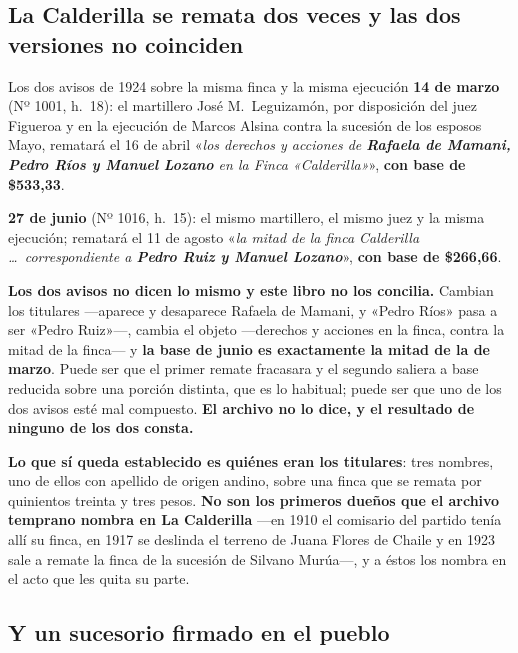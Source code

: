 \subsection*{La Calderilla se remata dos veces y las dos versiones no coinciden}

\begin{ficha}{Los dos avisos de 1924 sobre la misma finca y la misma ejecución}
\textbf{14 de marzo} (Nº 1001, h.\ 18): el martillero José M.\ Leguizamón, por disposición del
juez Figueroa y en la ejecución de Marcos Alsina contra la sucesión de los esposos Mayo,
rematará el 16 de abril «\textit{los derechos y acciones de \textbf{Rafaela de Mamani, Pedro Ríos
y Manuel Lozano} en la Finca «Calderilla»}», \textbf{con base de \$533,33}.

\textbf{27 de junio} (Nº 1016, h.\ 15): el mismo martillero, el mismo juez y la misma ejecución;
rematará el 11 de agosto «\textit{la mitad de la finca Calderilla \ldots\ correspondiente a
\textbf{Pedro Ruiz y Manuel Lozano}}», \textbf{con base de \$266,66}.
\end{ficha}

\begin{cautela}
\textbf{Los dos avisos no dicen lo mismo y este libro no los concilia.} Cambian los titulares
---aparece y desaparece Rafaela de Mamani, y «Pedro Ríos» pasa a ser «Pedro Ruiz»---, cambia el
objeto ---derechos y acciones en la finca, contra la mitad de la finca--- y \textbf{la base de
junio es exactamente la mitad de la de marzo}. Puede ser que el primer remate fracasara y el
segundo saliera a base reducida sobre una porción distinta, que es lo habitual; puede ser que uno
de los dos avisos esté mal compuesto. \textbf{El archivo no lo dice, y el resultado de ninguno de
los dos consta.}

\textbf{Lo que sí queda establecido es quiénes eran los titulares}: tres nombres, uno de ellos con apellido de
origen andino, sobre una finca que se remata por quinientos treinta y tres pesos. \textbf{No son
los primeros dueños que el archivo temprano nombra en La Calderilla} ---en 1910 el comisario del partido tenía allí su finca, en 1917 se deslinda el terreno de Juana Flores de Chaile y en 1923 sale a remate la finca de la sucesión de Silvano Murúa---, y a éstos los
nombra en el acto que les quita su parte.
\end{cautela}

\subsection*{Y un sucesorio firmado en el pueblo}


